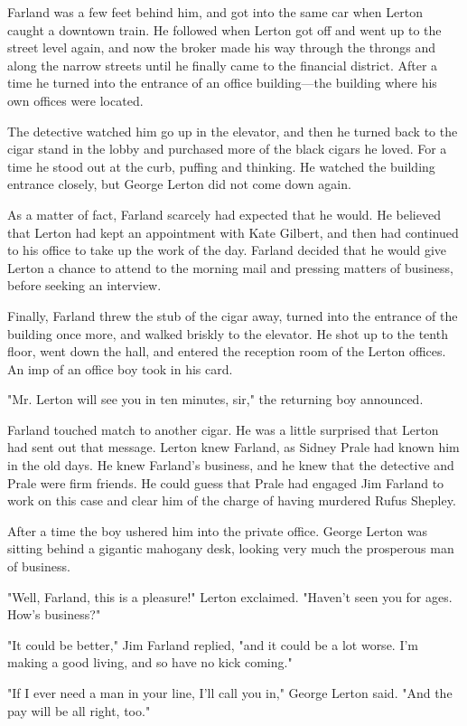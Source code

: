 \documentclass{novel}
\begin{document}
Farland was a few feet behind him, and got into the same car when Lerton caught a downtown train. He followed when Lerton got off and went up to the street level again, and now the broker made his way through the throngs and along the narrow streets until he finally came to the financial district. After a time he turned into the entrance of an office building---the building where his own offices were located.

The detective watched him go up in the elevator, and then he turned back to the cigar stand in the lobby and purchased more of the black cigars he loved. For a time he stood out at the curb, puffing and thinking. He watched the building entrance closely, but George Lerton did not come down again.

As a matter of fact, Farland scarcely had expected that he would. He believed that Lerton had kept an appointment with Kate Gilbert, and then had continued to his office to take up the work of the day. Farland decided that he would give Lerton a chance to attend to the morning mail and pressing matters of business, before seeking an interview.

Finally, Farland threw the stub of the cigar away, turned into the entrance of the building once more, and walked briskly to the elevator. He shot up to the tenth floor, went down the hall, and entered the reception room of the Lerton offices. An imp of an office boy took in his card.

"Mr. Lerton will see you in ten minutes, sir," the returning boy announced.

Farland touched match to another cigar. He was a little surprised that Lerton had sent out that message. Lerton knew Farland, as Sidney Prale had known him in the old days. He knew Farland's business, and he knew that the detective and Prale were firm friends. He could guess that Prale had engaged Jim Farland to work on this case and clear him of the charge of having murdered Rufus Shepley.

After a time the boy ushered him into the private office. George Lerton was sitting behind a gigantic mahogany desk, looking very much the prosperous man of business.

"Well, Farland, this is a pleasure!" Lerton exclaimed. "Haven't seen you for ages. How's business?"

"It could be better," Jim Farland replied, "and it could be a lot worse. I'm making a good living, and so have no kick coming."

"If I ever need a man in your line, I'll call you in," George Lerton said. "And the pay will be all right, too."
\end{document}
